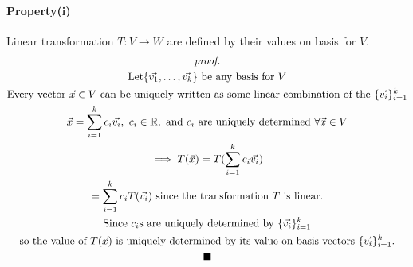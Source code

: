 \documentclass[11pt]{article}
\begin{document}
	\paragraph{Property(i)} Linear transformation $T: V \to W$ are  defined by their values on  basis for $V$.
	\begin{multline*}
	\emph{proof.}\\
		\text{Let} \{\vec{v_1},\dots,\vec{v_k}\} \text{ be any basis for }V\\
		\text{Every vector } \vec{x} \in V \text{ can be uniquely written as some linear combination of the }\{\vec{v_i}\}_{i=1}^k\\
		\vec{x} = \sum_{i=1}^k{c_i\vec{v_i}},\ c_i \in \mathbb{R}, \text{ and $c_i$ are uniquely determined } \forall \vec{x} \in V \\
		\implies T(\vec{x}) = T(\sum_{i=1}^k{c_i\vec{v_i}}) \\
		= \sum_{i=1}^k{c_i T(\vec{v_i})} \text{ since the transformation $T$ is linear.}\\
		\text{Since $c_i$s are uniquely determined by }\{\vec{v_i}\}_{i=1}^k \\
		\text{so the value of $T(\vec{x})$ is uniquely determined by its value on basis vectors $\{\vec{v_i}\}_{i=1}^k$.} \\
		\blacksquare
	\end{multline*}
	
\end{document}
